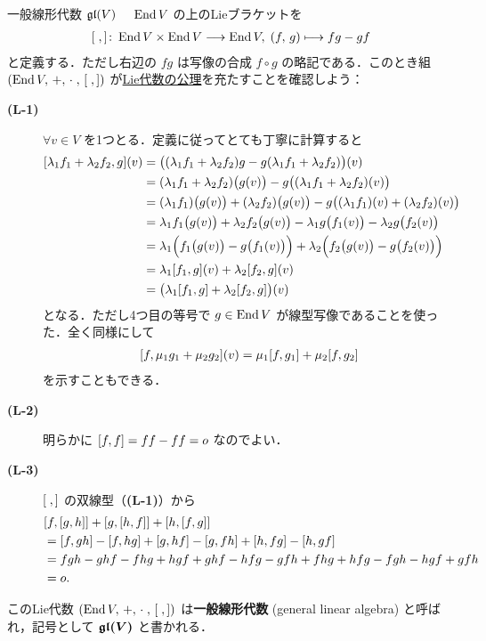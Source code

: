 \documentclass[rep_main]{subfiles}
\begin{document}
\begin{myexample}[label=def:gl-alg]{一般線形代数 $\mathfrak{gl} (V)$}
    　$\operatorname{End} V$ の上のLieブラケットを
    \begin{align}
        \label{eq:Liebracket-gl}
        \comm{\;}{\,} \colon \End V \times \End V \lto \End V,\; (f,\, g) \lmto fg - gf
    \end{align}
    と定義する．ただし右辺の $fg$ は写像の合成 $f \circ g$ の略記である．このとき組 $(\End V,\, +,\, \cdot\;,\, \comm{\;}{\,})$ が\hyperref[ax:LieAlg]{Lie代数の公理}を充たすことを確認しよう：
    \begin{description}
        \item[\textbf{(L-1)}] $\forall v \in V$ を1つとる．定義に従ってとても丁寧に計算すると
        \begin{align}
            \comm{\lambda_1 f_1 + \lambda_2 f_2}{g}(v) 
            &= \bigl( (\lambda_1 f_1 + \lambda_2 f_2) g - g (\lambda_1 f_1 + \lambda_2 f_2) \bigr)(v) \\
            &= (\lambda_1 f_1 + \lambda_2 f_2) \bigl( g(v) \bigr) - g \bigl((\lambda_1 f_1 + \lambda_2 f_2)(v)\bigr) \\
            &= (\lambda_1 f_1) \bigl(g (v) \bigr) + (\lambda_2 f_2) \bigl( g(v) \bigr) - g \bigl( (\lambda_1 f_1)(v) + (\lambda_2 f_2)(v)  \bigr) \\
            &= \lambda_1 f_1 \bigl(g (v) \bigr) + \lambda_2 f_2 \bigl( g(v) \bigr) - \lambda_1 g \bigl( f_1(v) \bigr) - \lambda_2 g \bigl( f_2(v) \bigr) \\
            &= \lambda_1 \Bigl( f_1 \bigl(g (v) \bigr) - g \bigl( f_1(v) \bigr) \Bigr) + \lambda_2 \Bigl(f_2 \bigl( g(v) \bigr) - g \bigl( f_2(v) \bigr) \Bigr) \\
            &= \lambda_1 \comm{f_1}{g} (v) + \lambda_2 \comm{f_2}{g} (v) \\
            &= \bigl( \lambda_1 \comm{f_1}{g} + \lambda_2 \comm{f_2}{g}  \bigr) (v)
        \end{align}
        となる．ただし4つ目の等号で $g \in \operatorname{End} V$ が線型写像であることを使った．全く同様にして
        \begin{align}
            \comm{f}{\mu_1 g_1 + \mu_2 g_2}(v) = \mu_1 \comm{f}{g_1} + \mu_2 \comm{f}{g_2}
        \end{align}
        を示すこともできる．
        \item[\textbf{(L-2)}] 明らかに $\comm{f}{f} = ff - ff = o$ なのでよい．
        \item[\textbf{(L-3)}] $\comm{\;}{\,}$ の双線型（\textsf{\textbf{(L-1)}}）から
        \begin{align}
            &\comm{f}{\comm{g}{h}} + \comm{g}{\comm{h}{f}} + \comm{h}{\comm{f}{g}} \\
            &= \comm{f}{gh} - \comm{f}{hg} + \comm{g}{hf} - \comm{g}{fh} + \comm{h}{fg} - \comm{h}{gf} \\
            &= fgh - ghf - fhg + hgf + ghf - hfg - gfh + fhg + hfg - fgh - hgf + gfh \\
            &= o.
        \end{align}
    \end{description}
    このLie代数 $(\End V,\, +,\, \cdot\;,\, \comm{\;}{\,})$ は\textbf{一般線形代数} (general linear algebra) と呼ばれ，記号として $\bm{\mathfrak{gl} (V)}$ と書かれる．


\end{myexample}
\end{document}
